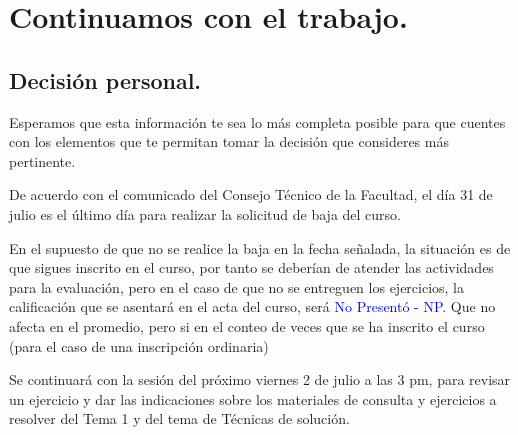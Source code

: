 \section{Continuamos con el trabajo.}
\subsection{Decisión personal.}

Esperamos que esta información te sea lo más completa posible para que cuentes con los elementos que te permitan tomar la decisión que consideres más pertinente.

De acuerdo con el comunicado del Consejo Técnico de la Facultad, el día 31 de julio es el último día para realizar la solicitud de baja del curso.
\par
En el supuesto de que no se realice la baja en la fecha señalada, la situación es de que sigues inscrito en el curso, por tanto se deberían de atender las actividades para la evaluación, pero en el caso de que no se entreguen los ejercicios, la calificación que se asentará en el acta del curso, será \textcolor{blue}{No Presentó -  NP}.  Que no afecta en el promedio, pero si en el conteo de veces que se ha inscrito el curso (para el caso de una inscripción ordinaria)
\par
Se continuará con la sesión del próximo viernes 2 de julio a las 3 pm, para revisar un ejercicio y dar las indicaciones sobre los materiales de consulta y ejercicios a resolver del Tema 1 y del tema de Técnicas de solución.
